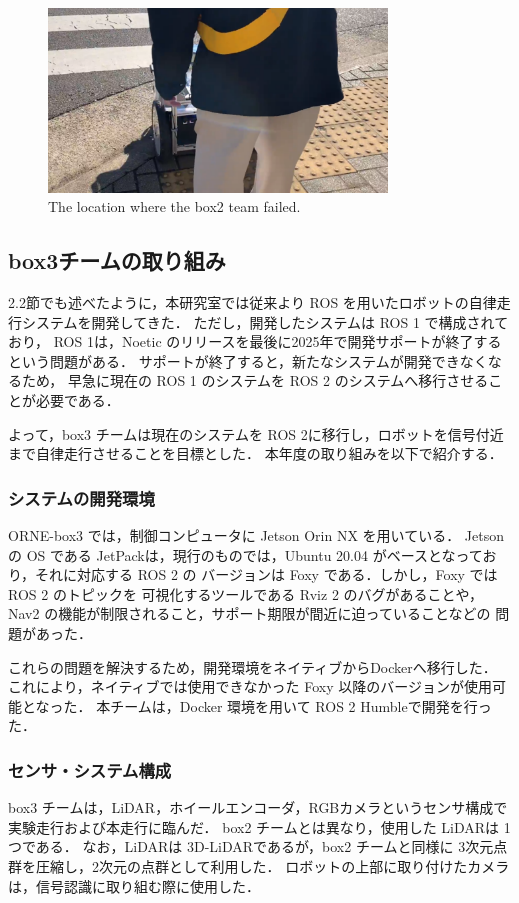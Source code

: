 \documentclass[twocolumn, 9pt]{jsproceedings}
\begin{document}
\begin{figure}[h!]
  \centering
  \includegraphics[width=90mm]{fig/result_box2_cut.pdf}
  \caption{The location where the box2 team failed.}
  \label{fig:box2-result}
\end{figure}

\subsection{box3チームの取り組み}
2.2節でも述べたように，本研究室では従来より ROS を用いたロボットの自律走行システムを開発してきた．
ただし，開発したシステムは ROS 1 で構成されており，
ROS 1は，Noetic\cite{noetic} のリリースを最後に2025年で開発サポートが終了するという問題がある．
サポートが終了すると，新たなシステムが開発できなくなるため，
早急に現在の ROS 1 のシステムを ROS 2 のシステムへ移行させることが必要である．

よって，box3 チームは現在のシステムを ROS 2に移行し，ロボットを信号付近まで自律走行させることを目標とした．
本年度の取り組みを以下で紹介する．

\subsubsection{システムの開発環境}
ORNE-box3 では，制御コンピュータに Jetson Orin NX を用いている．
Jetson の OS である JetPackは，現行のものでは，Ubuntu 20.04 がベースとなっており，それに対応する ROS 2 の
バージョンは Foxy\cite{foxy} である．しかし，Foxy では ROS 2 のトピックを 可視化するツールである Rviz 2 
のバグがあることや，Nav2\cite{nav2} の機能が制限されること，サポート期限が間近に迫っていることなどの
問題があった．

これらの問題を解決するため，開発環境をネイティブからDockerへ移行した．
これにより，ネイティブでは使用できなかった Foxy 以降のバージョンが使用可能となった．
本チームは，Docker 環境を用いて ROS 2 Humble\cite{humble}で開発を行った．


\subsubsection{センサ・システム構成}
box3 チームは，LiDAR，ホイールエンコーダ，RGBカメラというセンサ構成で実験走行および本走行に臨んだ．
box2 チームとは異なり，使用した LiDARは 1つである．
なお，LiDARは 3D-LiDARであるが，box2 チームと同様に 3次元点群を圧縮し，2次元の点群として利用した．
ロボットの上部に取り付けたカメラは，信号認識に取り組む際に使用した．
\end{document}

